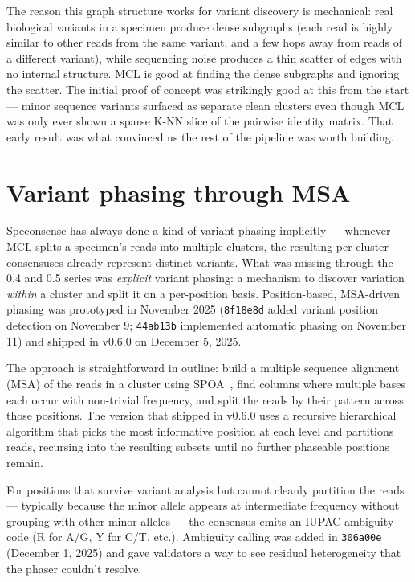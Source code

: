 \documentclass[11pt]{article}
\begin{document}
The reason this graph structure works for variant discovery is mechanical:
real biological variants in a specimen produce dense subgraphs (each read is
highly similar to other reads from the same variant, and a few hops away from
reads of a different variant), while sequencing noise produces a thin scatter
of edges with no internal structure. MCL is good at finding the dense
subgraphs and ignoring the scatter. The initial proof of concept was
strikingly good at this from the start --- minor sequence variants surfaced
as separate clean clusters even though MCL was only ever shown a sparse K-NN
slice of the pairwise identity matrix. That early result was what convinced
us the rest of the pipeline was worth building.

\section{Variant phasing through MSA}

Speconsense has always done a kind of variant phasing implicitly --- whenever
MCL splits a specimen's reads into multiple clusters, the resulting per-cluster
consensuses already represent distinct variants. What was missing through the
0.4 and 0.5 series was \emph{explicit} variant phasing: a mechanism to discover
variation \emph{within} a cluster and split it on a per-position basis.
Position-based, MSA-driven phasing was prototyped in November 2025
(\texttt{8f18e8d} added variant position detection on November 9;
\texttt{44ab13b} implemented automatic phasing on November 11) and shipped in
v0.6.0 on December 5, 2025.

The approach is straightforward in outline: build a multiple sequence alignment
(MSA) of the reads in a cluster using SPOA~\cite{vaser2017,lee2003}, find columns
where multiple bases each occur with non-trivial frequency, and split the reads
by their pattern across those positions. The version that shipped in v0.6.0
uses a recursive hierarchical algorithm that picks the most informative
position at each level and partitions reads, recursing into the resulting
subsets until no further phaseable positions remain.

For positions that survive variant analysis but cannot cleanly partition the
reads --- typically because the minor allele appears at intermediate frequency
without grouping with other minor alleles --- the consensus emits an IUPAC
ambiguity code (R for A/G, Y for C/T, etc.). Ambiguity calling was added in
\texttt{306a00e} (December 1, 2025) and gave validators a way to see residual
heterogeneity that the phaser couldn't resolve.
\end{document}
